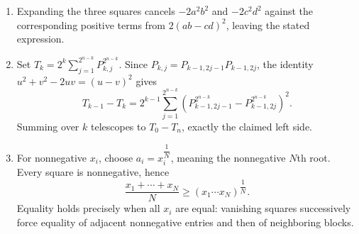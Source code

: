 \begin{enumerate}
\item Expanding the three squares cancels $-2a^2b^2$ and $-2c^2d^2$ against the corresponding positive terms from $2(ab-cd)^2$, leaving the stated expression.
\item Set $T_k=2^k\sum_{j=1}^{2^{n-k}}P_{k,j}^{2^{n-k}}$. Since $P_{k,j}=P_{k-1,2j-1}P_{k-1,2j}$, the identity $u^2+v^2-2uv=(u-v)^2$ gives
\[
T_{k-1}-T_k=
2^{k-1}\sum_{j=1}^{2^{n-k}}
\left(P_{k-1,2j-1}^{2^{n-k}}-P_{k-1,2j}^{2^{n-k}}\right)^2.
\]
Summing over $k$ telescopes to $T_0-T_n$, exactly the claimed left side.
\item For nonnegative $x_i$, choose $a_i=x_i^{\dfrac{1}{N}}$, meaning the nonnegative $N$th root. Every square is nonnegative, hence
\[
\boxed{\dfrac{x_1+\cdots+x_N}{N}\ge(x_1\cdots x_N)^{\dfrac{1}{N}}}.
\]
Equality holds precisely when all $x_i$ are equal: vanishing squares successively force equality of adjacent nonnegative entries and then of neighboring blocks.
\end{enumerate}
